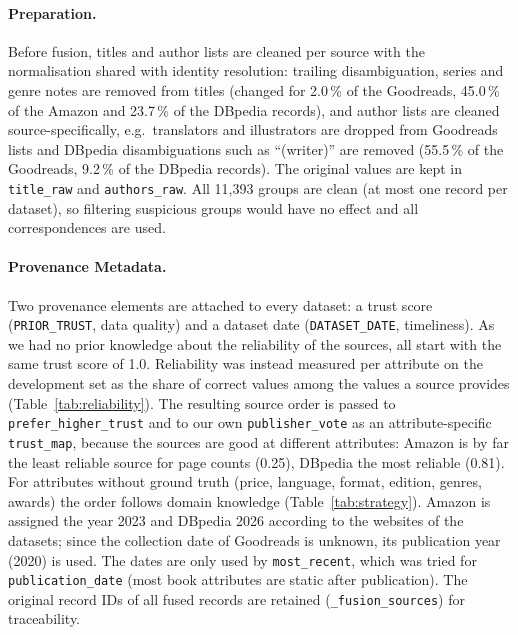\documentclass[a4paper,11pt]{article}
\begin{document}


\paragraph{Preparation.}
Before fusion, titles and author lists are cleaned per source with the
normalisation shared with identity resolution: trailing disambiguation, series and
genre notes are removed from titles (changed for 2.0\,\% of the Goodreads,
45.0\,\% of the Amazon and 23.7\,\% of the DBpedia records), and author lists are
cleaned source-specifically, e.g.\ translators and illustrators are dropped from
Goodreads lists and DBpedia disambiguations such as ``(writer)'' are removed
(55.5\,\% of the Goodreads, 9.2\,\% of the DBpedia records). The original values
are kept in \texttt{title\_raw} and \texttt{authors\_raw}. All 11,393 groups are
clean (at most one record per dataset), so filtering suspicious groups would have
no effect and all correspondences are used.


\paragraph{Provenance Metadata.}
Two provenance elements are attached to every dataset: a trust score
(\texttt{PRIOR\_TRUST}, data quality) and a dataset date
(\texttt{DATASET\_DATE}, timeliness). As we had no prior knowledge about the
reliability of the sources, all start with the same trust score of 1.0. Reliability
was instead measured per attribute on the development set as the share of correct
values among the values a source provides (Table~\ref{tab:reliability}). The
resulting source order is passed to \texttt{prefer\_higher\_trust} and to our own
\texttt{publisher\_vote} as an attribute-specific \texttt{trust\_map}, because the
sources are good at different attributes: Amazon is by far the least reliable source
for page counts (0.25), DBpedia the most reliable (0.81). For attributes without
ground truth (price, language, format, edition, genres, awards) the order follows
domain knowledge (Table~\ref{tab:strategy}).
Amazon is assigned the year 2023 and DBpedia 2026 according to the websites of
the datasets; since the collection date of Goodreads is unknown, its publication
year (2020) is used. The dates are only used by \texttt{most\_recent}, which was
tried for \texttt{publication\_date} (most book attributes are static after
publication). The original record IDs of all fused records are retained
(\texttt{\_fusion\_sources}) for traceability.
\end{document}
